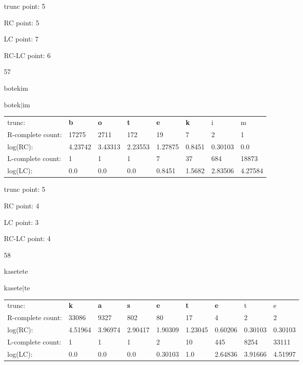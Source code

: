 \documentclass{article}
\begin{document}
trunc point: 5

RC point: 5

LC point: 7

RC-LC point: 6

\vspace{3em}



57

botekim

botek$|$im

\vspace{1em}

\begin{tabular}{l|lllllll}

trunc: & {\color{red}\bf b} & {\color{red}\bf o} & {\color{red}\bf t} & {\color{red}\bf e} & {\color{red}\bf k} & i & m \\ 
R-complete count: & 17275 & 2711 & 172 & 19 & 7 & 2 & 1 \\ 
log(RC): & 4.23742 & 3.43313 & 2.23553 & 1.27875 & 0.8451 & 0.30103 & 0.0 \\ 
L-complete count: & 1 & 1 & 1 & 7 & 37 & 684 & 18873 \\ 
log(LC): & 0.0 & 0.0 & 0.0 & 0.8451 & 1.5682 & 2.83506 & 4.27584 \\ 
\end{tabular}

trunc point: 5

RC point: 4

LC point: 3

RC-LC point: 4

\vspace{3em}



58

kasetete

kasete$|$te

\vspace{1em}

\begin{tabular}{l|llllllll}

trunc: & {\color{red}\bf k} & {\color{red}\bf a} & {\color{red}\bf s} & {\color{red}\bf e} & {\color{red}\bf t} & {\color{red}\bf e} & t & e \\ 
R-complete count: & 33086 & 9327 & 802 & 80 & 17 & 4 & 2 & 2 \\ 
log(RC): & 4.51964 & 3.96974 & 2.90417 & 1.90309 & 1.23045 & 0.60206 & 0.30103 & 0.30103 \\ 
L-complete count: & 1 & 1 & 1 & 2 & 10 & 445 & 8254 & 33111 \\ 
log(LC): & 0.0 & 0.0 & 0.0 & 0.30103 & 1.0 & 2.64836 & 3.91666 & 4.51997 \\ 
\end{tabular}
\end{document}
